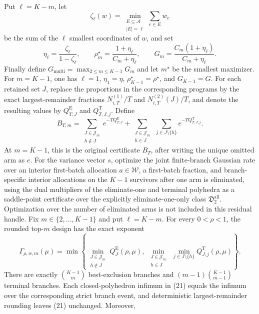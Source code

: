Put \(\ell=K-m\), let
\[
 \zeta_\ell(w)=\min_{\substack{E\subseteq\mathcal A\\|E|=\ell}}\sum_{e\in E}w_e
\]
be the sum of the \(\ell\) smallest coordinates of \(w\), and set
\[
 \eta_\ell=\frac{\zeta_\ell}{1-\zeta_\ell},\qquad
 \rho_m^\star=\frac{1+\eta_\ell}{C_m+\eta_\ell},\qquad
 G_m=\frac{C_m(1+\eta_\ell)}{C_m+\eta_\ell}.
\]
Finally define \(G_{\mathrm{multi}}=\max_{2\le m\le K-1}G_m\) and let \(m^\star\) be the smallest maximizer. For \(m=K-1\), one has \(\ell=1\), \(\eta_1=\eta\), \(\rho_{K-1}^\star=\rho^\star\), and \(G_{K-1}=G\).
For each retained set \(J\), replace the proportions in the corresponding programs by the exact largest-remainder fractions \(N_{i,T}^{(1)}/T\) and \(N_{i,T}^{(2)}(J)/T\), and denote the resulting values by \(Q_{T,J}^{\mathrm E}\) and \(Q_{T,J,j}^{\mathrm T}\). Define
\[
 B_{T,m}=\sum_{\substack{J\in\mathcal J_m\\h\notin J}}e^{-TQ_{T,J}^{\mathrm E}}
 +\sum_{\substack{J\in\mathcal J_m\\h\in J}}\ \sum_{j\in J\setminus\{h\}}e^{-TQ_{T,J,j}^{\mathrm T}}.
\]
At \(m=K-1\), this is the original certificate \(B_T\), after writing the unique omitted arm as \(e\).
For the variance vector \(s\), optimize the joint finite-branch Gaussian rate over an interior first-batch allocation \(a\in\mathcal W\), a first-batch fraction, and branch-specific interior allocations on the \(K-1\) survivors after one arm is eliminated, using the dual multipliers of the eliminate-one and terminal polyhedra as a saddle-point certificate over the explicitly eliminate-one-only class \(\mathfrak D_2^{\mathrm{all}}\). Optimization over the number of eliminated arms is not included in this residual handle.
Fix \(m\in\{2,\ldots,K-1\}\) and put \(\ell=K-m\). For every \(0<\rho<1\), the rounded top-\(m\) design has the exact exponent
\[
 \Gamma_{\rho,w,m}(\mu)=
 \min\left\{
 \min_{\substack{J\in\mathcal J_m\\h\notin J}}Q_J^{\mathrm E}(\rho,\mu),\ 
 \min_{\substack{J\in\mathcal J_m\\h\in J}}\ \min_{j\in J\setminus\{h\}}Q_{J,j}^{\mathrm T}(\rho,\mu)
 \right\}. \tag{21}
\]
There are exactly \(\binom{K-1}{m}\) best-exclusion branches and \((m-1)\binom{K-1}{m-1}\) terminal branches. Each closed-polyhedron infimum in (21) equals the infimum over the corresponding strict branch event, and deterministic largest-remainder rounding leaves (21) unchanged. Moreover,
